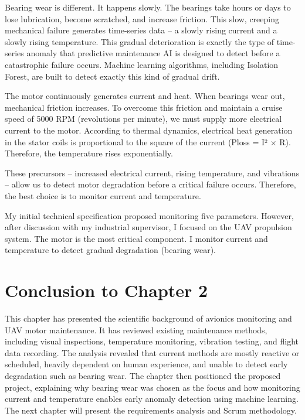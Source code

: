 Bearing wear is different. It happens slowly. The bearings take hours or days to lose lubrication, become scratched, and increase friction. This slow, creeping mechanical failure generates time-series data – a slowly rising current and a slowly rising temperature. This gradual deterioration is exactly the type of time-series anomaly that predictive maintenance AI is designed to detect before a catastrophic failure occurs. Machine learning algorithms, including Isolation Forest, are built to detect exactly this kind of gradual drift.

The motor continuously generates current and heat. When bearings wear out, mechanical friction increases. To overcome this friction and maintain a cruise speed of 5000 RPM (revolutions per minute), we must supply more electrical current to the motor. According to thermal dynamics, electrical heat generation in the stator coils is proportional to the square of the current (Ploss = I² × R). Therefore, the temperature rises exponentially.

These precursors – increased electrical current, rising temperature, and vibrations – allow us to detect motor degradation before a critical failure occurs. Therefore, the best choice is to monitor current and temperature.

My initial technical specification proposed monitoring five parameters. However, after discussion with my industrial supervisor, I focused on the UAV propulsion system. The motor is the most critical component. I monitor current and temperature to detect gradual degradation (bearing wear).

\section*{Conclusion to Chapter 2}

This chapter has presented the scientific background of avionics monitoring and UAV motor maintenance. It has reviewed existing maintenance methods, including visual inspections, temperature monitoring, vibration testing, and flight data recording. The analysis revealed that current methods are mostly reactive or scheduled, heavily dependent on human experience, and unable to detect early degradation such as bearing wear. The chapter then positioned the proposed project, explaining why bearing wear was chosen as the focus and how monitoring current and temperature enables early anomaly detection using machine learning. The next chapter will present the requirements analysis and Scrum methodology.
